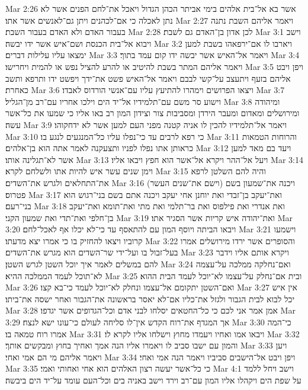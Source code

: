 Mar 2:26  אשר בא אל־בית אלהים בימי אביתר הכהן הגדול ויאכל את־לחם הפנים אשר לא נתן לאכלה כי אם־לכהנים ויתן גם־לאנשים אשר אתו׃
Mar 2:27  ויאמר אליהם השבת נתנה בעבור האדם ולא האדם בעבור השבת׃
Mar 2:28  לכן אדון בן־האדם גם לשבת׃
Mar 3:1  וישב ויבוא אל־בית הכנסת ושם־איש אשר ידו יבשה׃
Mar 3:2  ויארבו לו אם־ירפאהו בשבת למען ימצאו עליו עלילות דברים׃
Mar 3:3  ויאמר אל־האיש אשר יבשה ידו קום עמד בתוך׃
Mar 3:4  ויאמר אליהם המתר בשבת להיטיב או להרע להציל נפש או להמית ויחרישו׃
Mar 3:5  ויפן ויבט אליהם בזעף ויתעצב על־קשי לבבם ויאמר אל־האיש פשט את־ידך ויפשט ידו ותרפא ותשב כאחרת׃
Mar 3:6  ויצאו הפרושים וימהרו להתיעץ עליו עם־אנשי הורדוס לאבדו׃
Mar 3:7  וישוע סר משם עם־תלמידיו אל־יד הים וילכו אחריו עם־רב מן־הגליל׃
Mar 3:8  ומיהודה ומירושלים ומאדום ומעבר הירדן ומסביבות צור וצידון המון רב באו אליו כי שמעו את כל־אשר עשה׃
Mar 3:9  ויאמר אל־תלמידיו להכין לו אניה קטנה מפני העם למען אשר לא ידחקוהו׃
Mar 3:10  כי רפא לרבים עד כי־נפלו עליו כל־המנגעים לנגע בו׃
Mar 3:11  והרוחות הטמאות כראותן אתו נפלו לפניו ותצעקנה לאמר אתה הוא בן־אלהים׃
Mar 3:12  ויעד בם מאד למען אשר לא־תגלינה אותו׃
Mar 3:13  ויעל אל־ההר ויקרא אל־אשר הוא חפץ ויבאו אליו׃
Mar 3:14  וימן שנים עשר איש להיות אתו ולשלחם לקרא׃
Mar 3:15  והיה להם השלטן לרפא את־התחלאים ולגרש את־השדים׃
Mar 3:16  (וישם את־שנים העשר) ויכנה את־שמעון בשם פטרוס׃
Mar 3:17  ואת־יעקב בן־זבדי ואת יוחנן אחי יעקב ויכנה אתם בשם בני־רגוש הוא בני־רעם׃
Mar 3:18  ואת אנדרי ואת פילפוס ואת בר־תלמי ואת מתי ואת־תומא ואת־יעקב בן־חלפי ואת־תדי ואת שמעון הקני׃
Mar 3:19  ואת־יהודה איש קריות אשר הסגיר אתו׃
Mar 3:20  ויבאו הביתה ויוסף המון עם להתאסף עד כי־לא יכלו אף לאכל־לחם׃
Mar 3:21  וישמעו קרוביו ויצאו להחזיק בו כי אמרו יצא מדעתו׃
Mar 3:22  והסופרים אשר ירדו מירושלים אמרו בעל־זבול בו ועל־ידי שר־השדים הוא מגרש את־השדים׃
Mar 3:23  ויקרא אותם אליו וידבר להם במשלים לאמר איך יוכל השטן לגרש השטן׃
Mar 3:24  ואם־נחלקה ממלכה על־עצמה לא־תוכל לעמד הממלכה ההיא׃
Mar 3:25  ובית אם־נחלק על־עצמו לא־יוכל לעמד הבית ההוא׃
Mar 3:26  ואם־השטן יתקומם אל־עצמו ונחלק לא־יוכל לעמד כי־בא קצו׃
Mar 3:27  אין איש יכל לבוא לבית הגבור ולגזל את־כליו אם־לא יאסר בראשונה את־הגבור ואחר ישסה את־ביתו׃
Mar 3:28  אמן אמר אני לכם כי כל־החטאים יסלחו לבני אדם וכל־הגדופים אשר יגדפו׃
Mar 3:29  אך המגדף את־רוח הקדש אין־לו סליחה לעולם כי־עונו ישא לנצח׃
Mar 3:30  כי־המה אמרו רוח טמאה בו׃
Mar 3:31  ויבאו אמו ואחיו ויעמדו מחוץ וישלחו אליו לקרא לו׃
Mar 3:32  והמון עם ישבו סביב לו ויאמרו אליו הנה אמך ואחיך בחוץ ומבקשים אותך׃
Mar 3:33  ויען ויאמר אליהם מי הם אמי ואחי׃
Mar 3:34  ויפן ויבט אל־הישבים סביביו ויאמר הנה אמי ואחי׃
Mar 3:35  כי כל־אשר יעשה רצון האלהים הוא אחי ואחותי ואמי׃
Mar 4:1  וישב ויחל ללמד על שפת הים ויקהלו אליו המון עם־רב וירד וישב באניה בים וכל־העם עומד על־יד הים ביבשה׃
